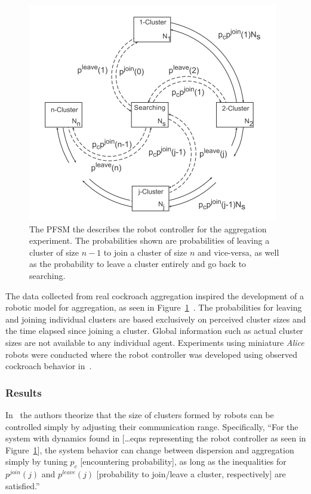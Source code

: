 \documentclass[Main.tex]{subfiles}
\begin{document}
\begin{figure}[!htb]
\centering\includegraphics[width=.5\textwidth]{aggfsm.png}
\caption{The PFSM the describes the robot controller for the aggregation experiment. The probabilities shown are probabilities of leaving a cluster of size $n-1$ to join a cluster of size $n$ and vice-versa, as well as the probability to leave a cluster entirely and go back to searching.}\label{fig:aggfsm}
\end{figure}

The data collected from real cockroach aggregation inspired the development of a robotic model for aggregation, as seen in Figure~\ref{fig:aggfsm}~\cite{Correll2007a}. The probabilities for leaving and joining individual clusters are based exclusively on perceived cluster sizes and the time elapsed since joining a cluster. Global information such as actual cluster sizes are not available to any individual agent. Experiments using miniature \emph{Alice} robots were conducted where the robot controller was developed using observed cockroach behavior in~\cite{Jeanson2005}.

\subsubsection*{Results}
In~\cite{Correll2011} the authors theorize that the size of clusters formed by robots can be controlled simply by adjusting their communication range. Specifically, ``For the system with dynamics found in [\ldots eqns representing the robot controller as seen in Figure~\ref{fig:aggfsm}], the system behavior can change between dispersion and aggregation simply by tuning $p_c$ [encountering probability], as long as the inequalities for $p^{join}(j)$ and $p^{leave}(j)$ [probability to join/leave a cluster, respectively] are satisfied.''
\end{document}
